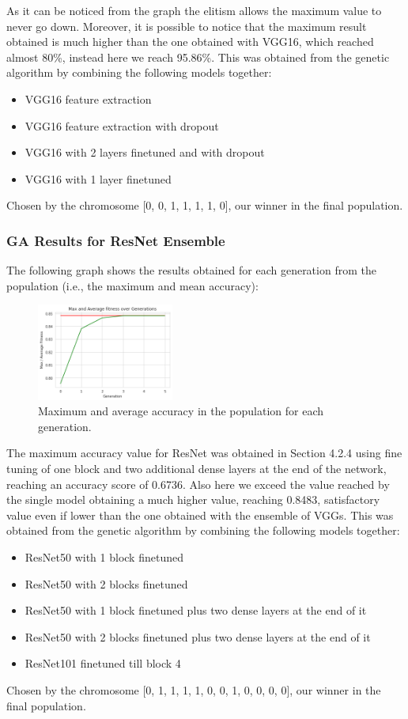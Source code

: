 As it can be noticed from the graph the elitism allows the maximum value to never go down. Moreover, it is possible to notice that the maximum result obtained is much higher than the one obtained with VGG16, which reached almost 80\%, instead here we reach 95.86\%. This was obtained from the genetic algorithm by combining the following models together:
 \begin{itemize}
	\item VGG16 feature extraction
	\item VGG16 feature extraction with dropout
	\item VGG16 with 2 layers finetuned and with dropout
         \item VGG16 with 1 layer finetuned
\end{itemize}
Chosen by the chromosome [0, 0, 1, 1, 1, 1, 0], our winner in the final population.



\subsubsection{GA Results for ResNet Ensemble}
The following graph shows the results obtained for each generation from the population (i.e., the maximum and mean accuracy):

\begin{figure}[H]
	\centering
	\includegraphics[width=0.4\textwidth]{img/ensemble/resnet.png}
	\caption{Maximum and average accuracy in the population for each generation.}
	\label{fig:ensembleresnet}
\end{figure}

The maximum accuracy value for ResNet was obtained in Section 4.2.4 using fine tuning of one block and two additional dense layers at the end of the network, reaching an accuracy score of 0.6736. Also here we exceed the value reached by the single model obtaining a much higher value, reaching 0.8483, satisfactory value even if lower than the one obtained with the ensemble of VGGs. This was obtained from the genetic algorithm by combining the following models together:
 \begin{itemize}
	\item ResNet50 with 1 block finetuned 
         \item ResNet50 with 2 blocks finetuned 
         \item ResNet50 with 1 block finetuned plus two dense layers at the end of it
         \item ResNet50 with 2 blocks finetuned plus two dense layers at the end of it
	\item ResNet101 finetuned till block 4
\end{itemize}
Chosen by the chromosome [0, 1, 1, 1, 1, 0, 0, 1, 0, 0, 0, 0], our winner in the final population.


